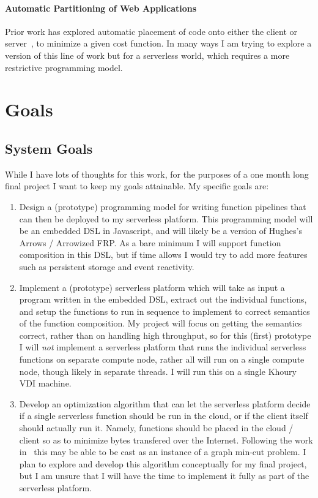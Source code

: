 \documentclass[12pt]{article}
\begin{document}
\paragraph{Automatic Partitioning of Web Applications}
Prior work has explored automatic placement of code onto
either the client or server~\cite{chong:swift}, to minimize
a given cost function.
In many ways I am trying to explore a version of this line of
work but for a serverless world, which requires a more
restrictive programming model.

\section{Goals}

\subsection{System Goals}

While I have lots of thoughts for this work, for the purposes
of a one month long final project I want to keep my goals
attainable. My specific goals are:

\begin{enumerate}
  \item Design a (prototype) programming model for writing
    function pipelines that can then be deployed to my
    serverless platform. This programming model
    will be an embedded DSL in Javascript, and will likely
    be a version of Hughes's Arrows / Arrowized FRP.
    As a bare minimum I will support function composition
    in this DSL, but if time allows I would try to add
    more features such as persistent storage and event
    reactivity.
  \item Implement a (prototype) serverless platform
    which will take as input a program written in the embedded DSL,
    extract out the individual functions, and setup the functions
    to run in sequence to implement to correct semantics
    of the function composition. My project will focus on getting
    the semantics correct, rather than on handling high throughput,
    so for this (first) prototype I will \emph{not} implement
    a serverless platform that runs the individual serverless
    functions on separate compute node, rather all will run
    on a single compute node, though likely in separate threads.
    I will run this on a single Khoury VDI machine.
  \item Develop an optimization algorithm that can let the
    serverless platform decide if a single serverless function
    should be run in the cloud, or if the client itself should
    actually run it. Namely, functions should be placed in the
    cloud / client so as to minimize bytes transfered over the
    Internet. 
    Following the work in~\cite{chong:swift} this
    may be able to be cast as an instance of a graph 
    min-cut problem.
    I plan to explore and develop this algorithm conceptually
    for my final project, but I am unsure that I will have
    the time to implement it fully as part of the serverless
    platform.
\end{enumerate}
\end{document}
